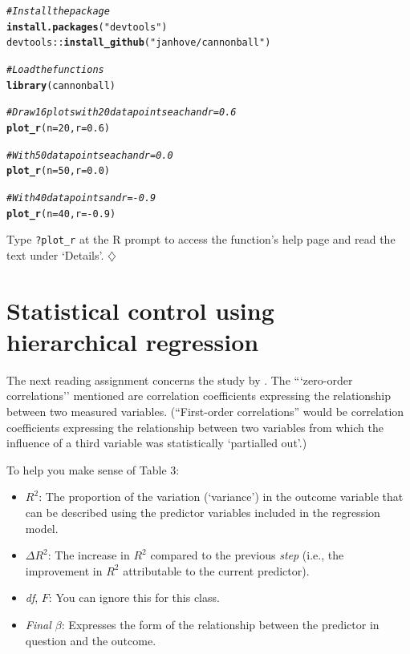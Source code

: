 \documentclass[a4paper]{tufte-book}\usepackage[]{graphicx}\usepackage[]{xcolor}
\makeatletter
\newcommand{\hlnum}[1]{\textcolor[rgb]{0.686,0.059,0.569}{#1}}%
\newcommand{\hlsng}[1]{\textcolor[rgb]{0.192,0.494,0.8}{#1}}%
\newcommand{\hlcom}[1]{\textcolor[rgb]{0.678,0.584,0.686}{\textit{#1}}}%
\newcommand{\hlopt}[1]{\textcolor[rgb]{0,0,0}{#1}}%
\newcommand{\hldef}[1]{\textcolor[rgb]{0.345,0.345,0.345}{#1}}%
\newcommand{\hlkwc}[1]{\textcolor[rgb]{0.333,0.667,0.333}{#1}}%
\newcommand{\hlkwd}[1]{\textcolor[rgb]{0.737,0.353,0.396}{\textbf{#1}}}%
\newenvironment{kframe}{%
 \def\at@end@of@kframe{}%
 \ifinner\ifhmode%
  \def\at@end@of@kframe{\end{minipage}}%
  \begin{minipage}{\columnwidth}%
 \fi\fi%
 \def\FrameCommand##1{\hskip\@totalleftmargin \hskip-\fboxsep
 \colorbox{shadecolor}{##1}\hskip-\fboxsep
     \hskip-\linewidth \hskip-\@totalleftmargin \hskip\columnwidth}%
 \MakeFramed {\advance\hsize-\width
   \@totalleftmargin\z@ \linewidth\hsize
   \@setminipage}}%
 {\par\unskip\endMakeFramed%
 \at@end@of@kframe}
\newenvironment{knitrout}{}{} %
\newcommand*{\parend}[1][$\diamondsuit$]{%
\leavevmode\unskip\penalty9999 \hbox{}\nobreak\hfill
    \quad\hbox{#1}%
}
\makeatother
\begin{document}
\begin{knitrout}
\color{fgcolor}\begin{kframe}
\begin{alltt}
\hlcom{# Install the package}
\hlkwd{install.packages}\hldef{(}\hlsng{"devtools"}\hldef{)}
\hldef{devtools}\hlopt{::}\hlkwd{install_github}\hldef{(}\hlsng{"janhove/cannonball"}\hldef{)}

\hlcom{# Load the functions}
\hlkwd{library}\hldef{(cannonball)}

\hlcom{# Draw 16 plots with 20 data points each and r = 0.6}
\hlkwd{plot_r}\hldef{(}\hlkwc{n} \hldef{=} \hlnum{20}\hldef{,} \hlkwc{r} \hldef{=} \hlnum{0.6}\hldef{)}

\hlcom{# With 50 data points each and r = 0.0}
\hlkwd{plot_r}\hldef{(}\hlkwc{n} \hldef{=} \hlnum{50}\hldef{,} \hlkwc{r} \hldef{=} \hlnum{0.0}\hldef{)}

\hlcom{# With 40 data points and r = -0.9}
\hlkwd{plot_r}\hldef{(}\hlkwc{n} \hldef{=} \hlnum{40}\hldef{,} \hlkwc{r} \hldef{=} \hlopt{-}\hlnum{0.9}\hldef{)}
\end{alltt}
\end{kframe}
\end{knitrout}

Type \texttt{?plot\_r} at the R prompt to access the function's
help page and read the text under `Details'.\parend

\section{Statistical control using hierarchical regression}

The next reading assignment concerns the study by \citet{Slevc2006}.
The ```zero-order correlations'' mentioned
are correlation coefficients expressing the relationship between two measured variables.
(``First-order correlations'' would be correlation coefficients expressing the relationship between two variables from which the influence of a third variable was statistically `partialled out'.)

To help you make sense of Table 3:
\begin{itemize}
 \item $R^2$: The proportion of the variation (`variance') in the outcome variable that can be described using the predictor
 variables included in the regression model.

 \item $\Delta R^2$: The increase in $R^2$ compared to the previous \textit{step} (i.e., the improvement in $R^2$ attributable to the current predictor).

 \item \textit{df}, $F$: You can ignore this for this class.

 \item \textit{Final $\beta$}: Expresses the form of the relationship between the predictor in question and the outcome.
\end{itemize}
\end{document}
